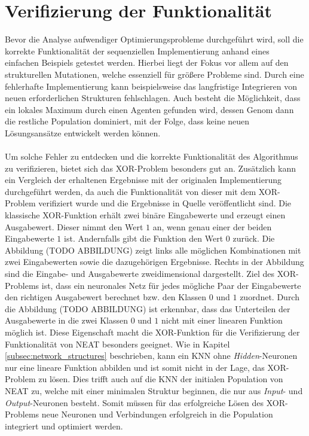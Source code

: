 \section{Verifizierung der Funktionalität}
\label{sec:analysis_valdation_functionality}
Bevor die Analyse aufwendiger Optimierungsprobleme durchgeführt wird, soll die korrekte Funktionalität der sequenziellen Implementierung anhand eines einfachen Beispiels getestet werden. Hierbei liegt der Fokus vor allem auf den strukturellen Mutationen, welche essenziell für größere Probleme sind. Durch eine fehlerhafte Implementierung kann beispielsweise das langfristige Integrieren von neuen erforderlichen Strukturen fehlschlagen. Auch besteht die Möglichkeit, dass ein lokales Maximum durch einen Agenten gefunden wird, dessen Genom dann die restliche Population dominiert, mit der Folge, dass keine neuen Lösungsansätze entwickelt werden können.
\\\\
Um solche Fehler zu entdecken und die korrekte Funktionalität des Algorithmus zu verifizieren, bietet sich das XOR-Problem besonders gut an. Zusätzlich kann ein Vergleich der erhaltenen Ergebnisse mit der originalen Implementierung durchgeführt werden, da auch die Funktionalität von dieser mit dem XOR-Problem verifiziert wurde und die Ergebnisse in Quelle \cite{stanley2002evolving} veröffentlicht sind. Die klassische XOR-Funktion erhält zwei binäre Eingabewerte und erzeugt einen Ausgabewert. Dieser nimmt den Wert $1$ an, wenn genau einer der beiden Eingabewerte $1$ ist. Andernfalls gibt die Funktion den Wert $0$ zurück. Die Abbildung (TODO ABBILDUNG) zeigt links alle möglichen Kombinationen mit zwei Eingabewerten sowie die dazugehörigen Ergebnisse. Rechts in der Abbildung sind die Eingabe- und Ausgabewerte zweidimensional dargestellt. Ziel des XOR-Problems ist, dass ein neuronales Netz für jedes mögliche Paar der Eingabewerte den richtigen Ausgabewert berechnet bzw. den Klassen $0$ und $1$ zuordnet. Durch die Abbildung (TODO ABBILDUNG) ist erkennbar, dass das Unterteilen der Ausgabewerte in die zwei Klassen $0$ und $1$ nicht mit einer linearen Funktion möglich ist. Diese Eigenschaft macht die XOR-Funktion für die Verifizierung der Funktionalität von \ac{NEAT} besonders geeignet. Wie in Kapitel \ref{subsec:network_structures} beschrieben, kann ein \ac{KNN} ohne \emph{Hidden}-Neuronen nur eine lineare Funktion abbilden und ist somit nicht in der Lage, das XOR-Problem zu lösen. Dies trifft auch auf die \ac{KNN} der initialen Population von \ac{NEAT} zu, welche mit einer minimalen Struktur beginnen, die nur aus \emph{Input}- und \emph{Output}-Neuronen besteht. Somit müssen für das erfolgreiche Lösen des XOR-Problems neue Neuronen und Verbindungen erfolgreich in die Population integriert und optimiert werden. 

